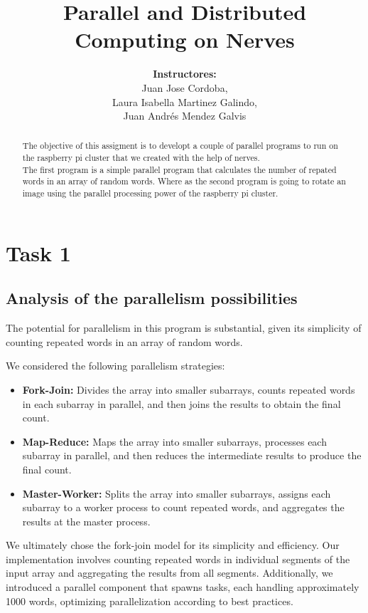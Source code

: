 \documentclass[12pt]{article}
\title{Parallel and Distributed Computing on Nerves}
\author{\textbf{Instructores:} \\
Juan Jose Cordoba, \\
Laura Isabella Martinez Galindo, \\
Juan Andrés Mendez Galvis}
\date{}
\begin{document}
\maketitle

\begin{abstract}
  The objective of this assigment is to developt a couple of parallel programs to run on the raspberry pi cluster that we created with the help of nerves. \\
  The first program is a simple parallel program that calculates the number of repated words in an array of random words. Where as the second program is going to rotate an image using the parallel processing power of the raspberry pi cluster. \\
\end{abstract}

\section{Task 1}

\subsection{Analysis of the parallelism possibilities}

The potential for parallelism in this program is substantial, given its simplicity of counting repeated words in an array of random words.

We considered the following parallelism strategies:

\begin{itemize}
  \item \textbf{Fork-Join:} Divides the array into smaller subarrays, counts repeated words in each subarray in parallel, and then joins the results to obtain the final count.
  \item \textbf{Map-Reduce:} Maps the array into smaller subarrays, processes each subarray in parallel, and then reduces the intermediate results to produce the final count.
  \item \textbf{Master-Worker:} Splits the array into smaller subarrays, assigns each subarray to a worker process to count repeated words, and aggregates the results at the master process.
\end{itemize}

We ultimately chose the fork-join model for its simplicity and efficiency. Our implementation involves counting repeated words in individual segments of the input array and aggregating the results from all segments. Additionally, we introduced a parallel component that spawns tasks, each handling approximately 1000 words, optimizing parallelization according to best practices.
\end{document}
